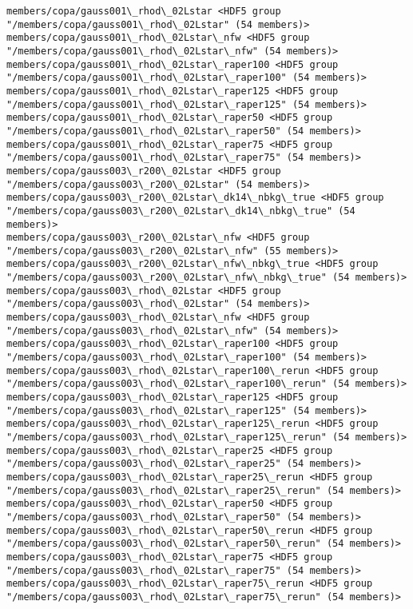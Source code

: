 \documentclass[11pt]{article}
\begin{document}
\begin{Verbatim}[commandchars=\\\{\}]
members/copa/gauss001\_rhod\_02Lstar <HDF5 group "/members/copa/gauss001\_rhod\_02Lstar" (54 members)>
members/copa/gauss001\_rhod\_02Lstar\_nfw <HDF5 group "/members/copa/gauss001\_rhod\_02Lstar\_nfw" (54 members)>
members/copa/gauss001\_rhod\_02Lstar\_raper100 <HDF5 group "/members/copa/gauss001\_rhod\_02Lstar\_raper100" (54 members)>
members/copa/gauss001\_rhod\_02Lstar\_raper125 <HDF5 group "/members/copa/gauss001\_rhod\_02Lstar\_raper125" (54 members)>
members/copa/gauss001\_rhod\_02Lstar\_raper50 <HDF5 group "/members/copa/gauss001\_rhod\_02Lstar\_raper50" (54 members)>
members/copa/gauss001\_rhod\_02Lstar\_raper75 <HDF5 group "/members/copa/gauss001\_rhod\_02Lstar\_raper75" (54 members)>
members/copa/gauss003\_r200\_02Lstar <HDF5 group "/members/copa/gauss003\_r200\_02Lstar" (54 members)>
members/copa/gauss003\_r200\_02Lstar\_dk14\_nbkg\_true <HDF5 group "/members/copa/gauss003\_r200\_02Lstar\_dk14\_nbkg\_true" (54 members)>
members/copa/gauss003\_r200\_02Lstar\_nfw <HDF5 group "/members/copa/gauss003\_r200\_02Lstar\_nfw" (55 members)>
members/copa/gauss003\_r200\_02Lstar\_nfw\_nbkg\_true <HDF5 group "/members/copa/gauss003\_r200\_02Lstar\_nfw\_nbkg\_true" (54 members)>
members/copa/gauss003\_rhod\_02Lstar <HDF5 group "/members/copa/gauss003\_rhod\_02Lstar" (54 members)>
members/copa/gauss003\_rhod\_02Lstar\_nfw <HDF5 group "/members/copa/gauss003\_rhod\_02Lstar\_nfw" (54 members)>
members/copa/gauss003\_rhod\_02Lstar\_raper100 <HDF5 group "/members/copa/gauss003\_rhod\_02Lstar\_raper100" (54 members)>
members/copa/gauss003\_rhod\_02Lstar\_raper100\_rerun <HDF5 group "/members/copa/gauss003\_rhod\_02Lstar\_raper100\_rerun" (54 members)>
members/copa/gauss003\_rhod\_02Lstar\_raper125 <HDF5 group "/members/copa/gauss003\_rhod\_02Lstar\_raper125" (54 members)>
members/copa/gauss003\_rhod\_02Lstar\_raper125\_rerun <HDF5 group "/members/copa/gauss003\_rhod\_02Lstar\_raper125\_rerun" (54 members)>
members/copa/gauss003\_rhod\_02Lstar\_raper25 <HDF5 group "/members/copa/gauss003\_rhod\_02Lstar\_raper25" (54 members)>
members/copa/gauss003\_rhod\_02Lstar\_raper25\_rerun <HDF5 group "/members/copa/gauss003\_rhod\_02Lstar\_raper25\_rerun" (54 members)>
members/copa/gauss003\_rhod\_02Lstar\_raper50 <HDF5 group "/members/copa/gauss003\_rhod\_02Lstar\_raper50" (54 members)>
members/copa/gauss003\_rhod\_02Lstar\_raper50\_rerun <HDF5 group "/members/copa/gauss003\_rhod\_02Lstar\_raper50\_rerun" (54 members)>
members/copa/gauss003\_rhod\_02Lstar\_raper75 <HDF5 group "/members/copa/gauss003\_rhod\_02Lstar\_raper75" (54 members)>
members/copa/gauss003\_rhod\_02Lstar\_raper75\_rerun <HDF5 group "/members/copa/gauss003\_rhod\_02Lstar\_raper75\_rerun" (54 members)>

\end{Verbatim}
\end{document}
